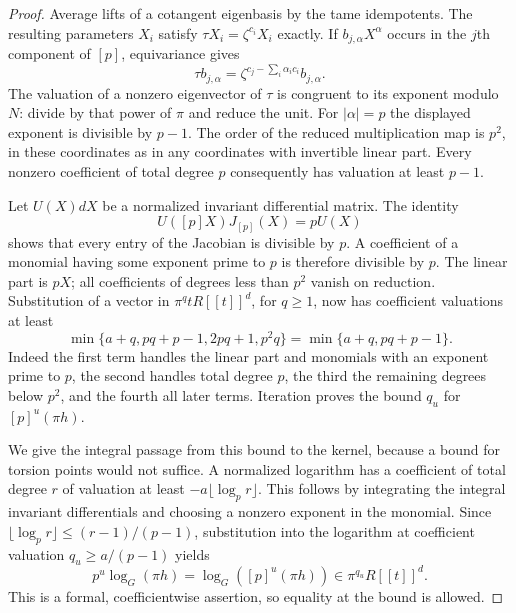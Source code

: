 \begin{proof}
Average lifts of a cotangent eigenbasis by the tame idempotents. The resulting parameters $X_i$ satisfy $\tau X_i=\zeta^{c_i}X_i$ exactly. If $b_{j,\alpha}X^\alpha$ occurs in the $j$th component of $[p]$, equivariance gives
\[
       \tau b_{j,\alpha}=\zeta^{c_j-\sum_i\alpha_i c_i}b_{j,\alpha}.
\]
The valuation of a nonzero eigenvector of $\tau$ is congruent to its exponent modulo $N$: divide by that power of $\pi$ and reduce the unit. For $|\alpha|=p$ the displayed exponent is divisible by $p-1$. The order of the reduced multiplication map is $p^2$, in these coordinates as in any coordinates with invertible linear part. Every nonzero coefficient of total degree $p$ consequently has valuation at least $p-1$.

Let $U(X)dX$ be a normalized invariant differential matrix. The identity
\[
                 U([p]X)J_{[p]}(X)=pU(X)
\]
shows that every entry of the Jacobian is divisible by $p$. A coefficient of a monomial having some exponent prime to $p$ is therefore divisible by $p$. The linear part is $pX$; all coefficients of degrees less than $p^2$ vanish on reduction. Substitution of a vector in $\pi^q tR[[t]]^d$, for $q\ge1$, now has coefficient valuations at least
\[
 \min\{a+q,pq+p-1,2pq+1,p^2q\}
                      =\min\{a+q,pq+p-1\}.
\]
Indeed the first term handles the linear part and monomials with an exponent prime to $p$, the second handles total degree $p$, the third the remaining degrees below $p^2$, and the fourth all later terms. Iteration proves the bound $q_u$ for $[p]^u(\pi h)$.

We give the integral passage from this bound to the kernel, because a bound for torsion points would not suffice. A normalized logarithm has a coefficient of total degree $r$ of valuation at least $-a\lfloor\log_p r\rfloor$. This follows by integrating the integral invariant differentials and choosing a nonzero exponent in the monomial. Since $\lfloor\log_p r\rfloor\le(r-1)/(p-1)$, substitution into the logarithm at coefficient valuation $q_u\ge a/(p-1)$ yields
\begin{equation}\label{eq:weighted-logarithm}
              p^u\log_G(\pi h)=\log_G([p]^u(\pi h))
                              \in\pi^{q_u}R[[t]]^d.
\end{equation}
This is a formal, coefficientwise assertion, so equality at the bound is allowed.


\end{proof}
